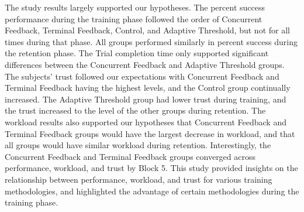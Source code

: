 The study results largely supported our hypotheses.
The percent success performance during the training phase followed the order of Concurrent Feedback, Terminal Feedback, Control, and Adaptive Threshold, but not for all times during that phase.
All groups performed similarly in percent success during the retention phase.
The Trial completion time only supported significant differences between the Concurrent Feedback and Adaptive Threshold groups.
The subjects' trust followed our expectations with Concurrent Feedback and Terminal Feedback having the highest levels, and the Control group continually increased.
The Adaptive Threshold group had lower trust during training, and the trust increased to the level of the other groups during retention.
The workload results also supported our hypotheses that Concurrent Feedback and Terminal Feedback groups would have the largest decrease in workload, and that all groups would have similar workload during retention.
Interestingly, the Concurrent Feedback and Terminal Feedback groups converged across performance, workload, and trust by Block 5.
This study provided insights on the relationship between performance, workload, and trust for various training methodologies, and highlighted the advantage of certain methodologies during the training phase.


% 

% 
